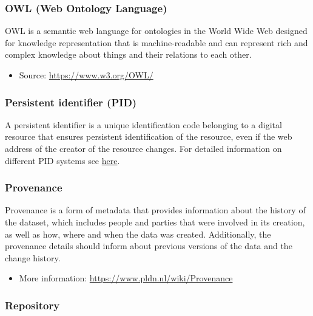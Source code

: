\documentclass[
  oneside]{book}
\providecommand{\tightlist}{%
  \setlength{\itemsep}{0pt}\setlength{\parskip}{0pt}}
\begin{document}
\subsubsection*{OWL (Web Ontology Language)}\label{OWL}

OWL is a semantic web language for ontologies in the World Wide Web designed for knowledge representation that is machine-readable and can represent rich and complex knowledge about things and their relations to each other.

\begin{itemize}
\tightlist
\item
  Source: \url{https://www.w3.org/OWL/}
\end{itemize}

\subsubsection*{Persistent identifier (PID)}\label{PID}

A persistent identifier is a unique identification code belonging to a digital resource that ensures persistent identification of the resource, even if the web address of the creator of the resource changes. For detailed information on different PID systems see \href{https://www.pidwijzer.nl/en}{here}.

\subsubsection*{Provenance}\label{provenance}

Provenance is a form of metadata that provides information about the history of the dataset, which includes people and parties that were involved in its creation, as well as how, where and when the data was created. Additionally, the provenance details should inform about previous versions of the data and the change history.

\begin{itemize}
\tightlist
\item
  More information: \url{https://www.pldn.nl/wiki/Provenance}
\end{itemize}

\subsubsection*{Repository}\label{repository}
\end{document}
